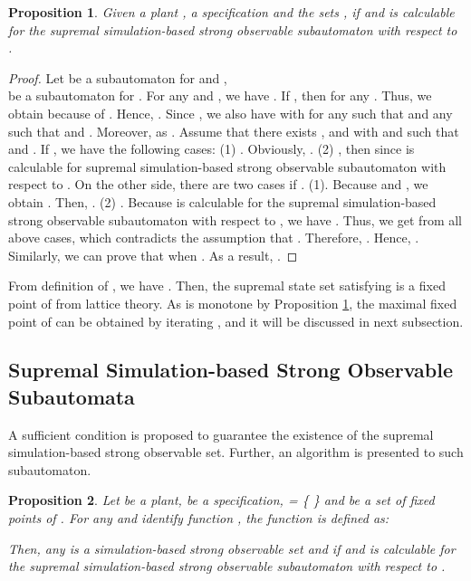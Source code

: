 \documentclass[12pt,draftcls,onecolumn]{IEEEtran}
\newtheorem{Proposition}{Proposition}
\begin{document}
\begin{Proposition}\label{nm}
Given a plant , a specification  and the sets ,  if  and
 is calculable for the supremal simulation-based strong
observable subautomaton with respect to .
\end{Proposition}

\begin{proof}
Let  be a
subautomaton for  and
,
\\
 be a subautomaton for . For any 
and , we have . If , then  for any . Thus, we obtain  because of
. Hence, . Since , we also have  with  for any  such
that  and any  such that
 and . Moreover,  as . Assume that there exists ,  and  with  and 
such that  and . If , we have the following
cases: (1) . Obviously, . (2) , then
 since  is calculable
for supremal simulation-based strong observable subautomaton with
respect to . On the other side, there are two cases if . (1). Because  and , we obtain
. Then, . (2) . Because  is
calculable for the supremal simulation-based strong observable
subautomaton with respect to , we have . Thus, we get  from all above cases, which contradicts the
assumption that . Therefore,
. Hence, . Similarly, we can prove that  when . As a result, .
\end{proof}






From definition of , we have .
Then, the supremal state set  satisfying 
is a fixed point of  from lattice theory. As  is
monotone by Proposition \ref{nm}, the maximal fixed point of
 can be obtained by iterating , and it will be
discussed in next subsection.









\subsection{Supremal Simulation-based Strong Observable Subautomata}
A sufficient condition is proposed to guarantee the existence of
the supremal simulation-based strong observable set. Further, an
algorithm is presented to such subautomaton.






\begin{Proposition}\label{supsn}
Let  be a plant,  be a specification,  = \{  \} and  be a set of
fixed points of . For any 
and identify function , the
function  is
defined as:

Then, any  is a simulation-based strong
observable set and  if  and  is calculable for the supremal simulation-based
strong observable subautomaton with respect to .
\end{Proposition}
\end{document}
